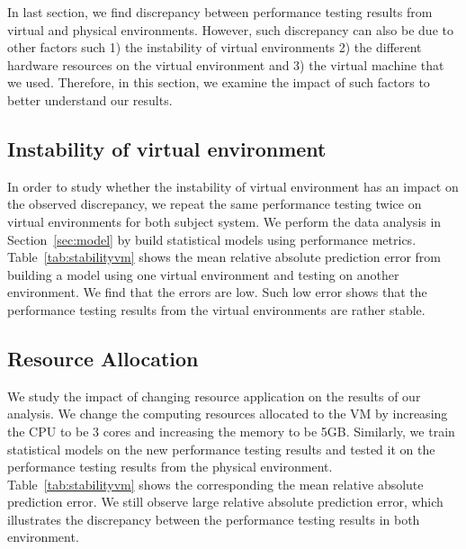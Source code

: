 In last section, we find discrepancy between performance testing results from virtual and physical environments. However, such discrepancy can also be due to other factors such 1) the instability of virtual environments 2) the different hardware resources on the virtual environment and 3) the virtual machine that we used. Therefore, in this section, we examine the impact of such factors to better understand our results. 


\subsection{Instability of virtual environment}

In order to study whether the instability of virtual environment has an impact on the observed discrepancy, we repeat the same performance testing twice on virtual environments for both subject system. We perform the data analysis in Section~\ref{sec:model} by build statistical models using performance metrics. Table~\ref{tab:stabilityvm} shows the mean relative absolute prediction error from building a model using one virtual environment and testing on another environment. We find that the errors are low. Such low error shows that the performance testing results from the virtual environments are rather stable. 






\subsection{Resource Allocation}
We study the impact of changing resource application on the results of our analysis. We change the computing resources allocated to the VM by increasing the CPU to be 3 cores and increasing the memory to be 5GB. Similarly, we train statistical models on the new performance testing results and tested it on the performance testing results from the physical environment. Table~\ref{tab:stabilityvm} shows the corresponding the mean relative absolute prediction error. We still observe large relative absolute prediction error, which illustrates the discrepancy between the performance testing results in both environment. 

